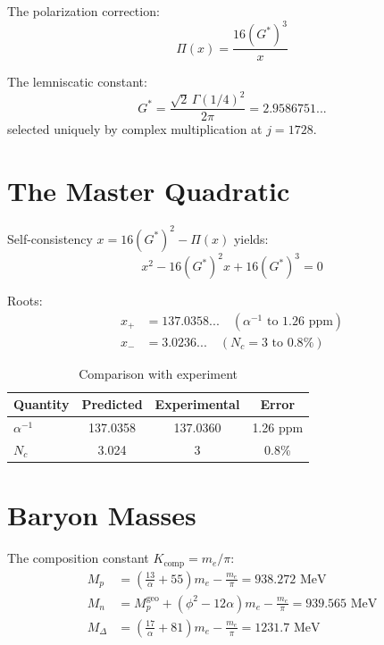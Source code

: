 \documentclass[aps,prl,twocolumn,showpacs,superscriptaddress,groupedaddress]{revtex4-2}
\begin{document}
The polarization correction:
\begin{equation}
\Pi(x) = \frac{16(G^*)^3}{x}
\end{equation}

The lemniscatic constant:
\begin{equation}
G^* = \frac{\sqrt{2}\,\Gamma(1/4)^2}{2\pi} = 2.9586751...
\end{equation}
selected uniquely by complex multiplication at $j = 1728$.

\section{The Master Quadratic}

Self-consistency $x = 16(G^*)^2 - \Pi(x)$ yields:
\begin{equation}
\boxed{x^2 - 16(G^*)^2 x + 16(G^*)^3 = 0}
\end{equation}

Roots:
\begin{align}
x_+ &= 137.0358... \quad (\alpha^{-1} \text{ to } 1.26 \text{ ppm}) \\
x_- &= 3.0236... \quad (N_c = 3 \text{ to } 0.8\%)
\end{align}

\begin{table}[h]
\caption{Comparison with experiment}
\begin{tabular}{lccc}
\hline
Quantity & Predicted & Experimental & Error \\
\hline
$\alpha^{-1}$ & 137.0358 & 137.0360 & 1.26 ppm \\
$N_c$ & 3.024 & 3 & 0.8\% \\
\hline
\end{tabular}
\end{table}

\section{Baryon Masses}

The composition constant $K_{\text{comp}} = m_e/\pi$:
\begin{align}
M_p &= \left(\frac{13}{\alpha} + 55\right)m_e - \frac{m_e}{\pi} = 938.272 \text{ MeV} \\
M_n &= M_p^{\text{geo}} + (\phi^2 - 12\alpha)m_e - \frac{m_e}{\pi} = 939.565 \text{ MeV} \\
M_\Delta &= \left(\frac{17}{\alpha} + 81\right)m_e - \frac{m_e}{\pi} = 1231.7 \text{ MeV}
\end{align}
\end{document}
